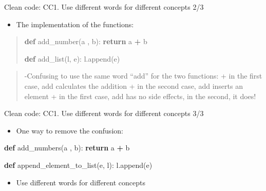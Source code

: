 \documentclass[
  8pt,
  ignorenonframetext,
]{beamer}
\newenvironment{Shaded}{\begin{snugshade}}{\end{snugshade}}
\newcommand{\ControlFlowTok}[1]{\textcolor[rgb]{0.13,0.29,0.53}{\textbf{#1}}}
\newcommand{\KeywordTok}[1]{\textcolor[rgb]{0.13,0.29,0.53}{\textbf{#1}}}
\newcommand{\NormalTok}[1]{#1}
\newcommand{\OperatorTok}[1]{\textcolor[rgb]{0.81,0.36,0.00}{\textbf{#1}}}
\providecommand{\tightlist}{%
  \setlength{\itemsep}{0pt}\setlength{\parskip}{0pt}}
\begin{document}
\begin{frame}[fragile]{Clean code: CC1. Use different words for
different concepts 2/3}
\protect\hypertarget{clean-code-cc1.-use-different-words-for-different-concepts-23}{}
\begin{itemize}[<+->]
\tightlist
\item
  The implementation of the functions:
\end{itemize}

\begin{quote}
\begin{Shaded}
\begin{Highlighting}[]
\KeywordTok{def}\NormalTok{ add\_number(a , b):}
  \ControlFlowTok{return}\NormalTok{ a }\OperatorTok{+}\NormalTok{ b}

\KeywordTok{def}\NormalTok{ add\_list(l, e):}
\NormalTok{  l.append(e)}
\end{Highlighting}
\end{Shaded}
\end{quote}

\begin{quote}
-Confusing to use the same word ``add'' for the two functions: + in the
first case, add calculates the addition + in the second case, add
inserts an element + in the first case, add has no side effects, in the
second, it does!
\end{quote}
\end{frame}

\begin{frame}[fragile]{Clean code: CC1. Use different words for
different concepts 3/3}
\protect\hypertarget{clean-code-cc1.-use-different-words-for-different-concepts-33}{}
\begin{itemize}
\tightlist
\item
  One way to remove the confusion:
\end{itemize}

\begin{Shaded}
\begin{Highlighting}[]
\KeywordTok{def}\NormalTok{ add\_numbers(a , b):}
    \ControlFlowTok{return}\NormalTok{ a }\OperatorTok{+}\NormalTok{ b}

\KeywordTok{def}\NormalTok{ append\_element\_to\_list(e, l):}
\NormalTok{    l.append(e)}
\end{Highlighting}
\end{Shaded}

\begin{itemize}
\tightlist
\item
  Use different words for different concepts
\end{itemize}
\end{frame}
\end{document}
